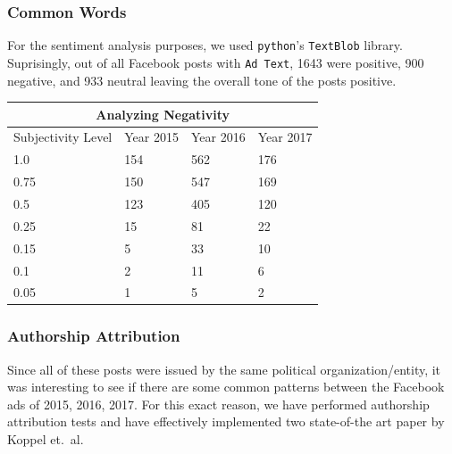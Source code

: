 \documentclass[11pt]{article}
\theoremstyle{definition}
\begin{document}
\subsubsection*{\centering Common Words}
For the sentiment analysis purposes, we used \texttt{python}'s \texttt{TextBlob}
library. Suprisingly, out of all Facebook posts with \texttt{Ad Text}, 1643 were
positive, 900 negative, and 933 neutral leaving the overall tone of the posts
positive.

\begin{center}
\begin{tabular}{ |p{3cm}|p{3cm}|p{3cm}|p{3cm}|  }
 \hline
 \multicolumn{4}{|c|}{Analyzing Negativity} \\
 \hline
 Subjectivity Level & Year 2015 & Year 2016 & Year 2017\\
 \hline
 1.0  & 154 & 562 & 176\\
 0.75 & 150 & 547 & 169\\
 0.5  & 123 & 405 & 120\\
 0.25 & 15  & 81  & 22 \\
 0.15 & 5   & 33  & 10 \\
 0.1  & 2   & 11  & 6  \\
 0.05 & 1   & 5   & 2  \\
 \hline
\end{tabular}
\end{center}



\subsubsection*{\centering Authorship Attribution}

Since all of these posts were issued by the same political organization/entity,
it was interesting to see if there are some common patterns between the
Facebook ads of 2015, 2016, 2017. For this exact reason, we have performed
authorship attribution tests and have effectively implemented two
state-of-the art paper by Koppel et.~al.


\newpage

\begin{center}
\printbibliography[heading=bibintoc]
\end{center}

\end{document}
